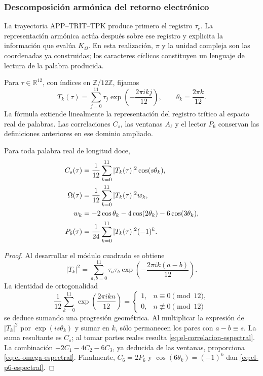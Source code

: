 \subsubsection{Descomposición armónica del retorno electrónico}
\label{sec:el-espectro-retorno}

La trayectoria APP--TRIT--TPK produce primero el registro
\(\tau_e\). La representación armónica actúa después sobre ese
registro y explicita la información que evalúa \(K_\Omega\).
En esta realización, \(\pi\) y la unidad compleja son las
coordenadas ya construidas; los caracteres cíclicos constituyen un
lenguaje de lectura de la palabra producida.

Para \(\tau\in\mathbb R^{12}\), con índices en
\(\mathbb Z/12\mathbb Z\), fijamos
\begin{equation}
 T_k(\tau)=\sum_{j=0}^{11}\tau_j
             \exp\!\left(-\frac{2\pi i kj}{12}\right),\qquad
 \theta_k=\frac{2\pi k}{12}.
 \label{eq:el-transformada-finita}
\end{equation}
La fórmula extiende linealmente la representación del registro
trítico al espacio real de palabras. Las correlaciones \(C_s\),
las ventanas \(A_\ell\) y el lector \(P_6\) conservan las
definiciones anteriores en ese dominio ampliado.

\begin{theorem}
\label{thm:el-lector-espectral}
Para toda palabra real de longitud doce,
\begin{align}
 C_s(\tau)&=\frac1{12}\sum_{k=0}^{11}|T_k(\tau)|^2
                         \cos(s\theta_k),
 \label{eq:el-correlacion-espectral}\\
 \Omega(\tau)&=\frac1{12}\sum_{k=0}^{11}|T_k(\tau)|^2w_k,
 \label{eq:el-omega-espectral}\\
 w_k&=-2\cos\theta_k-4\cos(2\theta_k)-6\cos(3\theta_k),\notag\\
 P_6(\tau)&=\frac1{24}\sum_{k=0}^{11}|T_k(\tau)|^2(-1)^k.
 \label{eq:el-p6-espectral}
\end{align}
\end{theorem}
\begin{proof}
Al desarrollar el módulo cuadrado se obtiene
\[
 |T_k|^2=\sum_{a,b=0}^{11}\tau_a\tau_b
           \exp\!\left(-\frac{2\pi i k(a-b)}{12}\right).
\]
La identidad de ortogonalidad
\[
 \frac1{12}\sum_{k=0}^{11}
       \exp\!\left(\frac{2\pi i k n}{12}\right)
 =\begin{cases}1,&n\equiv0\pmod{12},\\0,&n\not\equiv0\pmod{12}
   \end{cases}
\]
se deduce sumando una progresión geométrica. Al multiplicar la
expresión de \(|T_k|^2\) por \(\exp(is\theta_k)\) y sumar en
\(k\), sólo permanecen los pares con \(a-b\equiv s\).
La suma resultante es \(C_s\); al tomar partes reales resulta
\eqref{eq:el-correlacion-espectral}. La combinación
\(-2C_1-4C_2-6C_3\), ya deducida de las ventanas, proporciona
\eqref{eq:el-omega-espectral}. Finalmente,
\(C_6=2P_6\) y \(\cos(6\theta_k)=(-1)^k\) dan
\eqref{eq:el-p6-espectral}.
\end{proof}

